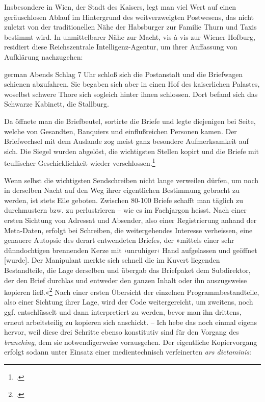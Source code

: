 \documentclass[a4paper,12pt]{article}
\newcommand{\anf}[1]{»#1«}
\newenvironment{zitat}{
\begin{spacing}{1}
\begin{foreigndisplayquote}{german}}%
{\end{foreigndisplayquote}\end{spacing}}
\begin{document}
Insbesondere in Wien, der Stadt des Kaisers, legt man viel Wert auf einen geräuschlosen Ablauf im Hintergrund des weitverzweigten Postwesens, das nicht zuletzt von der traditionellen Nähe der Habsburger zur Familie Thurn und Taxis bestimmt wird. In unmittelbarer Nähe zur Macht, vis-à-vis zur Wiener Hofburg, residiert diese Reichszentrale Intelligenz-Agentur, um ihrer Auffassung von Aufklärung nachzugehen:
\begin{zitat}
Abends Schlag 7 Uhr schloß sich die Postanstalt und die Briefwagen schienen abzufahren. Sie begaben sich aber in einen Hof des kaiserlichen Palastes, woselbst schwere Thore sich sogleich hinter ihnen schlossen. Dort befand sich das Schwarze Kabinett, die Stallburg.

Da öffnete man die Briefbeutel, sortirte die Briefe und legte diejenigen bei Seite, welche von Gesandten, Banquiers und einflußreichen Personen kamen. Der Briefwechsel mit dem Auslande zog meist ganz besondere Aufmerksamkeit auf sich. Die Siegel wurden abgelöst, die wichtigsten Stellen kopirt und die Briefe mit teuflischer Geschicklichkeit wieder verschlossen.\footcite[40]{koenig:1875}
\end{zitat}
Wenn selbst die wichtigsten Sendschreiben nicht lange verweilen dürfen, um noch in derselben Nacht auf den Weg ihrer eigentlichen Bestimmung gebracht zu werden, ist stets Eile geboten. Zwischen 80-100 Briefe schafft man täglich zu durchmustern bzw. zu perlustrieren – wie es im Fachjargon heisst. Nach einer ersten Sichtung von Adressat und Absender, also einer Registrierung anhand der Meta-Daten, erfolgt bei Schreiben, die weitergehendes Interesse verheissen, eine genauere Autopsie des derart entwendeten Briefes, der \anf{mittels einer sehr dünndochtigen brennenden Kerze mit ›unruhiger‹ Hand aufgelassen und geöffnet [wurde]. Der Manipulant merkte sich schnell die im Kuvert liegenden Bestandteile, die Lage derselben und übergab das Briefpaket dem Subdirektor, der den Brief durchlas und entweder den ganzen Inhalt oder ihn auszugsweise kopieren ließ.}\footcite[138]{stix:1937} Nach einer ersten Übersicht der einzelnen Programmbestandteile, also einer Sichtung ihrer Lage, wird der Code weitergereicht, um zweitens, noch ggf. entschlüsselt und dann interpretiert zu werden, bevor man ihn drittens, erneut arbeitsteilig zu kopieren sich anschickt. – Ich hebe das noch einmal eigens hervor, weil diese drei Schritte ebenso konstitutiv sind für den Vorgang des \emph{branching}, dem sie notwendigerweise vorausgehen. Der eigentliche Kopiervorgang erfolgt sodann unter Einsatz einer medientechnisch verfeinerten \emph{ars dictaminis}: 
\end{document}
